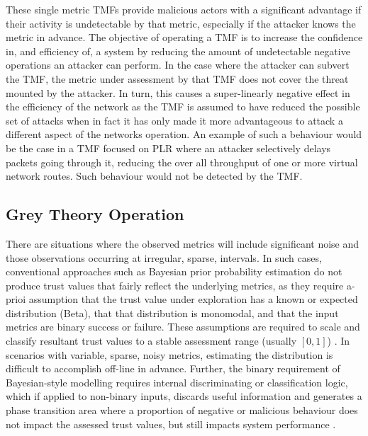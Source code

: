 \documentclass[runningheads,a4paper]{llncs}
\begin{document}
These single metric TMFs provide malicious actors with a significant advantage if their activity is undetectable by that metric, especially if the attacker knows the metric in advance.
The objective of operating a TMF is to increase the confidence in, and efficiency of, a system by reducing the amount of undetectable negative operations an attacker can perform.
In the case where the attacker can subvert the TMF, the metric under assessment by that TMF does not cover the threat mounted by the attacker.
In turn, this causes a super-linearly negative effect in the efficiency of the network as the TMF is assumed to have reduced the possible set of attacks when in fact it has only made it more advantageous to attack a different aspect of the networks operation.
An example of such a behaviour would be the case in a TMF focused on PLR where an attacker selectively delays packets going through it, reducing the over all throughput of one or more virtual network routes.
Such behaviour would not be detected by the TMF.

\subsection{Grey Theory Operation}

There are situations where the observed metrics will include significant noise and those observations occurring at irregular, sparse, intervals.
In such cases, conventional approaches such as Bayesian prior probability estimation do not produce trust values that fairly reflect the underlying metrics, as they require a-prioi assumption that the trust value under exploration has a known or expected distribution (Beta), that that distribution is monomodal, and that the input metrics are binary success or failure.
These assumptions are required to scale and classify resultant trust values to a stable assessment range (usually $[0,1]$) \cite{Liu2006}.
In scenarios with variable, sparse, noisy metrics, estimating the distribution is difficult to accomplish off-line in advance.
Further, the binary requirement of Bayesian-style modelling requires internal discriminating or classification logic, which if applied to non-binary inputs, discards useful information and generates a phase transition area where a proportion of negative or malicious behaviour does not impact the assessed trust values, but still impacts system performance \cite{Mundinger2008}.
\end{document}

